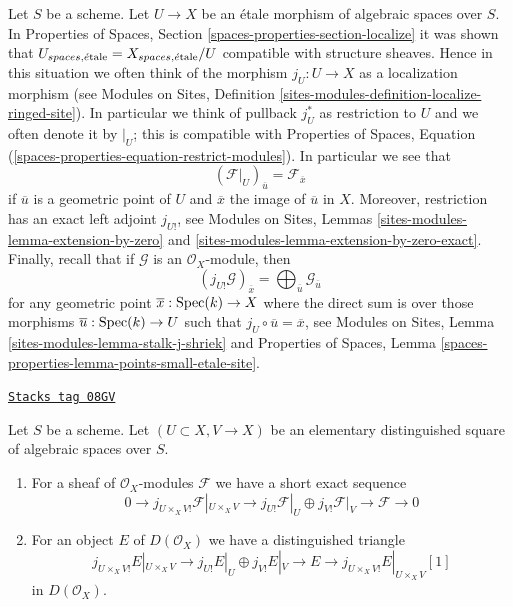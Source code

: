 \medskip\noindent
Let $S$ be a scheme. Let $U \to X$ be an \'etale morphism of algebraic
spaces over $S$. In
Properties of Spaces, Section \ref{spaces-properties-section-localize}
it was shown that
$U_{spaces, \acute{e}\text{tale}} = X_{spaces, \acute{e}\text{tale}}/U$
compatible with structure sheaves. Hence in this situation we
often think of the morphism $j_U : U \to X$ as a localization morphism
(see Modules on Sites, Definition
\ref{sites-modules-definition-localize-ringed-site}).
In particular we think of pullback $j_U^*$ as restriction to $U$
and we often denote it by ${}|_U$; this is compatible with
Properties of Spaces, Equation
(\ref{spaces-properties-equation-restrict-modules}).
In particular we see that
\begin{equation}
\label{equation-stalk-restriction}
(\mathcal{F}|_U)_{\overline{u}} = \mathcal{F}_{\overline{x}}
\end{equation}
if $\overline{u}$ is a geometric point of $U$ and $\overline{x}$
the image of $\overline{u}$ in $X$.
Moreover, restriction has an exact left adjoint $j_{U!}$, see
Modules on Sites, Lemmas \ref{sites-modules-lemma-extension-by-zero} and
\ref{sites-modules-lemma-extension-by-zero-exact}.
Finally, recall that if $\mathcal{G}$ is an $\mathcal{O}_X$-module,
then
\begin{equation}
\label{equation-stalk-j-shriek}
(j_{U!}\mathcal{G})_{\overline{x}} =
\bigoplus\nolimits_{\overline{u}} \mathcal{G}_{\overline{u}}
\end{equation}
for any geometric point $\overline{x} : \operatorname{Spec}(k) \to X$ where the
direct sum is over those morphisms $\overline{u} : \operatorname{Spec}(k) \to U$
such that $j_U \circ \overline{u} = \overline{x}$, see
Modules on Sites, Lemma \ref{sites-modules-lemma-stalk-j-shriek}
and
Properties of Spaces, Lemma
\ref{spaces-properties-lemma-points-small-etale-site}.

\begin{lemma}
\label{spaces-perfect-lemma-exact-sequence-lower-shriek}
\href{https://stacks.math.columbia.edu/tag/08GV}{\texttt{Stacks tag 08GV}}

Let $S$ be a scheme. Let $(U \subset X, V \to X)$ be an elementary
distinguished square of algebraic spaces over $S$.
\begin{enumerate}
\item For a sheaf of $\mathcal{O}_X$-modules $\mathcal{F}$
we have a short exact sequence
$$
0 \to j_{U \times_X V!}\mathcal{F}|_{U \times_X V} \to
j_{U!}\mathcal{F}|_U \oplus j_{V!}\mathcal{F}|_V \to \mathcal{F} \to 0
$$
\item For an object $E$ of $D(\mathcal{O}_X)$ we have a distinguished
triangle
$$
j_{U \times_X V!}E|_{U \times_X V} \to
j_{U!}E|_U \oplus j_{V!}E|_V \to E \to
j_{U \times_X V!}E|_{U \times_X V}[1]
$$
in $D(\mathcal{O}_X)$.
\end{enumerate}
\end{lemma}

